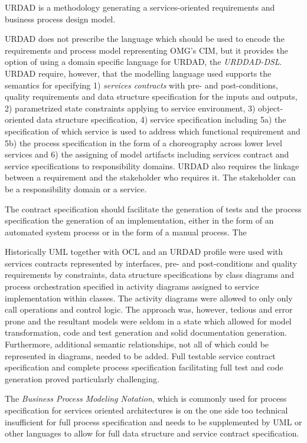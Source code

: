 URDAD is a methodology generating a services-oriented requirements and business process design model. 



URDAD does not prescribe the language which should be used to encode the requirements and process model representing OMG's CIM, but it provides the option of using a domain specific language for URDAD, the \emph{URDDAD-DSL}. URDAD require, however, that the modelling language used supports the semantics for specifying 1) \emph{services contracts} with pre- and post-conditions, quality requirements and data structure specification for the inputs and outputs, 2) parametrized state constraints applying to service environment, 3) object-oriented data structure specification, 4) service specification including 5a) the specification of which service is used to address which functional requirement and 5b) the process specification in the form of a choreography across lower level services and 6) the assigning of model artifacts including services contract and service specifications to responsibility domains. URDAD also requires the linkage between a requirement and the stakeholder who requires it. The stakeholder can be a responsibility domain or a service.

The contract specification should facilitate the generation of tests and the process specification the generation of an implementation, either in the form of an automated system process or in the form of a manual process. The


Historically UML together with OCL and an URDAD profile were used with services contracts represented by interfaces, pre- and post-conditions and quality requirements by constraints, data structure specifications by class diagrams and process orchestration specified in activity diagrams assigned to service implementation within classes. The activity diagrams were allowed to only only call operations and control logic. The approach was, however, tedious and error prone and the resultant models were seldom in a state which allowed for model transformation, code and test generation and solid documentation generation. Furthermore, additional semantic relationships, not all of which could be represented in diagrams, needed to be added. Full testable service contract specification and complete process specification facilitating full test and code generation proved particularly challenging.

The \emph{Business Process Modeling Notation}, which is commonly used for process specification for services oriented architectures is on the one side too technical \cite{} insufficient for full process specification and needs to be supplemented by UML or other languages to allow for full data structure and service contract specification.


